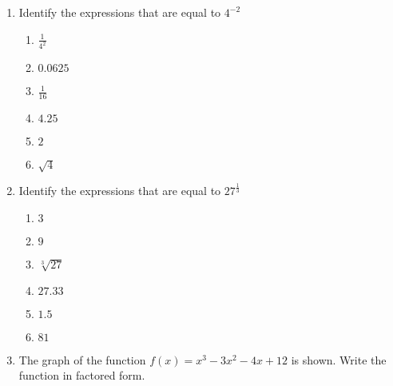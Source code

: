 \documentclass[12pt, twoside]{article}
\begin{document}
\begin{enumerate}
\item Identify the expressions that are equal to $\displaystyle 4^{-2}$
  \begin{multicols}{2}
    \begin{enumerate}
        \item $\displaystyle \frac{1}{4^2}$
        \item $0.0625$
        \item $\displaystyle \frac{1}{16}$
        \item $4.25$
        \item $2$
        \item $\sqrt{4}$
    \end{enumerate}
    \end{multicols}
    \item Identify the expressions that are equal to $\displaystyle 27^{\frac{1}{3}}$
      \begin{multicols}{2}
      \begin{enumerate}
          \item $3$
          \item $9$
          \item $\sqrt[3]{27}$
          \item $27.33$
          \item $1.5$
          \item $81$
      \end{enumerate}
      \end{multicols}

    \item The graph of the function $f(x) = x^3 - 3x^2 - 4x + 12$ is shown. Write the function in factored form. 
    \begin{flushright}
    \end{flushright}

\end{enumerate}
\end{document}
